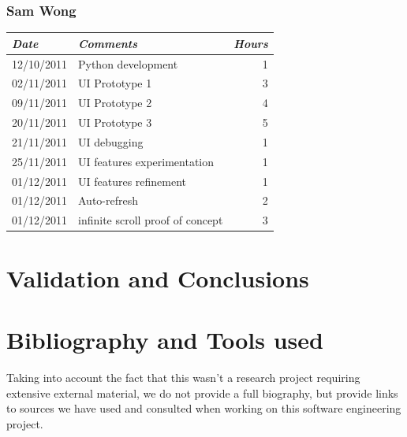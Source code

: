 \documentclass{report}
\begin{document}
		  \subsection{Sam Wong}
		  \begin{tabular}{l | p{10cm} r}
	     \emph{\large Date} & \emph{\large Comments} & \emph{\large Hours}\\
	     \hline
		   12/10/2011 & Python development & 1\\
	     02/11/2011 & UI Prototype 1 & 3\\
	     09/11/2011 & UI Prototype 2 & 4\\
	     20/11/2011 & UI Prototype 3 & 5\\
	     21/11/2011 & UI debugging & 1\\
	     25/11/2011 & UI features experimentation & 1\\
	     01/12/2011 & UI features refinement & 1\\
	     01/12/2011 & Auto-refresh & 2\\
	     01/12/2011 & infinite scroll proof of concept & 3\\
	    \end{tabular}
	
	\chapter{Validation and Conclusions}
	
	\chapter{Bibliography and Tools used}\label{chap:bib}
	
	Taking into account the fact that this wasn't a research project requiring extensive external material, we do not provide a full biography, but provide links to sources we have used and consulted when working on this software engineering project.
	
\end{document}
